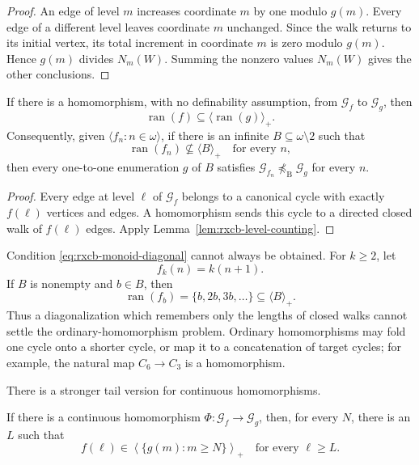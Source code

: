 \begin{proof}
An edge of level $m$ increases coordinate $m$ by one modulo $g(m)$.
Every edge of a different level leaves coordinate $m$ unchanged.
Since the walk returns to its initial vertex, its total increment in
coordinate $m$ is zero modulo $g(m)$.  Hence $g(m)$ divides $N_m(W)$.
Summing the nonzero values $N_m(W)$ gives the other conclusions.
\end{proof}

\begin{corollary}
\label{cor:rxcb-monoid-obstruction}
If there is a homomorphism, with no definability assumption, from
$\mathcal G_f$ to $\mathcal G_g$, then
\[
  \operatorname{ran}(f)
  \subseteq\langle\operatorname{ran}(g)\rangle_+.
\]
Consequently, given $\langle f_n:n\in\omega\rangle$, if there is an
infinite $B\subseteq\omega\setminus2$ such that
\begin{equation}
  \operatorname{ran}(f_n)\not\subseteq\langle B\rangle_+
  \quad\text{for every }n,
  \label{eq:rxcb-monoid-diagonal}
\end{equation}
then every one-to-one enumeration $g$ of $B$ satisfies
$\mathcal G_{f_n}\not\preceq_{\mathrm B}\mathcal G_g$ for every $n$.
\end{corollary}

\begin{proof}
Every edge at level $\ell$ of $\mathcal G_f$ belongs to a canonical
cycle with exactly $f(\ell)$ vertices and edges.  A homomorphism sends
this cycle to a directed closed walk of $f(\ell)$ edges.  Apply
Lemma~\ref{lem:rxcb-level-counting}.
\end{proof}

Condition \eqref{eq:rxcb-monoid-diagonal} cannot always be obtained.
For $k\geq2$, let
\[
  f_k(n)=k(n+1).
\]
If $B$ is nonempty and $b\in B$, then
\[
  \operatorname{ran}(f_b)=\{b,2b,3b,\dots\}
  \subseteq\langle B\rangle_+.
\]
Thus a diagonalization which remembers only the lengths of closed
walks cannot settle the ordinary-homomorphism problem.  Ordinary
homomorphisms may fold one cycle onto a shorter cycle, or map it to a
concatenation of target cycles; for example, the natural map
$C_6\to C_3$ is a homomorphism.

There is a stronger tail version for continuous homomorphisms.

\begin{lemma}
\label{lem:rxcb-tail-monoid}
If there is a continuous homomorphism
$\Phi:\mathcal G_f\to\mathcal G_g$, then, for every $N$, there is an
$L$ such that
\[
  f(\ell)\in
  \left\langle\{g(m):m\geq N\}\right\rangle_+
  \quad\text{for every }\ell\geq L.
\]
\end{lemma}

